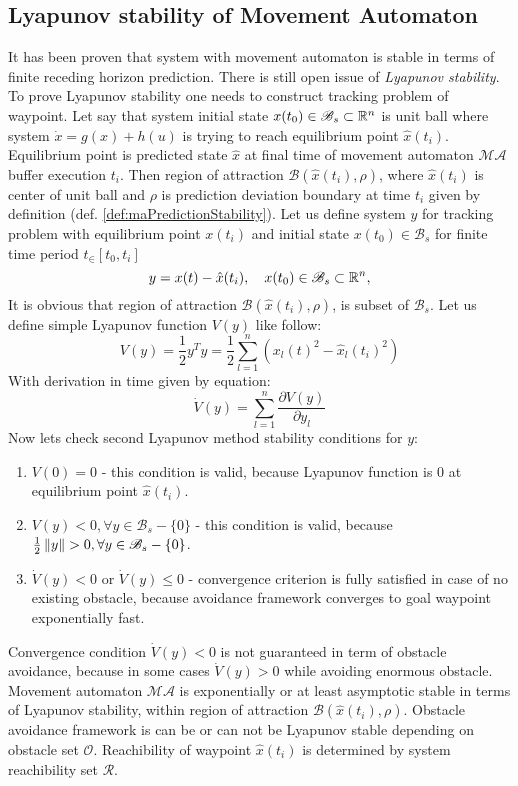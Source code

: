 \subsection{Lyapunov stability of Movement Automaton}\label{s:maLyapunov}
\noindent It has been proven that system with movement automaton is stable in terms of finite receding horizon prediction. There is still open issue of \textit{Lyapunov stability}. To prove Lyapunov stability one needs to construct tracking problem of waypoint. Let say that system initial state $x(t_0)\in \mathscr{B}_s \subset \mathbb{R}^n$ is unit ball where system $\dot{x} = g(x) + h(u)$ is trying to reach equilibrium point $\hat{x}(t_i)$. Equilibrium point is predicted state $\hat{x}$ at final time of movement automaton $\mathscr{MA}$ buffer execution $t_i$. Then region of attraction $\mathscr{B}(\hat{x}(t_i),\rho)$, where $\hat{x}(t_i)$ is center of unit ball and $\rho$ is prediction deviation boundary at time $t_i$ given by definition (def. \ref{def:maPredictionStability}). Let us define system $y$ for tracking problem with equilibrium point $x(t_i)$ and initial state $x(t_0)\in\mathscr{B}_s$ for finite time period $t_\in[t_0,t_i]$
\begin{equation}
    y = {x}(t)-\hat{x}(t_i), \quad x(t_0)\in\mathscr{B}_s\subset\mathbb{R}^n, 
\end{equation}
\noindent It is obvious that region of attraction $\mathscr{B}(\hat{x}(t_i),\rho)$, is subset of $\mathscr{B}_s$. Let us define simple Lyapunov function $V(y)$ like follow:
\begin{equation}
    V(y) = \frac{1}{2}y^Ty = \frac{1}{2}\sum_{l=1}^n\left(x_l(t)^2-\hat{x}_l(t_i)^2\right)
\end{equation}
\noindent With derivation in time given by equation:
\begin{equation}
    \dot{V}(y)= \sum_{l=1}^n \frac{\partial V(y)}{\partial y_l}
\end{equation}
\noindent Now lets check second Lyapunov method stability conditions for $y$:
\begin{enumerate}
    \item $V(0)=0$ - this condition is valid, because Lyapunov function is 0 at equilibrium point $\hat{x}(t_i)$.
    \item $V(y) < 0, \forall y\in\mathscr{B}_s-\{0\}$ - this condition is valid, because $\frac{1}{2}\left\lVert y\right\rVert>0,\forall y\in\mathscr{B}_s-\{0\}$.
    \item $\dot{V}(y)<0$ or $\dot{V}(y)\le0$ - convergence criterion is fully satisfied in case of no existing obstacle, because avoidance framework converges to goal waypoint exponentially fast.
\end{enumerate}
\noindent Convergence condition $\dot{V}(y)<0$ is not guaranteed in term of obstacle avoidance, because in some cases $\dot{V}(y)>0$ while avoiding enormous obstacle. Movement automaton $\mathscr{MA}$ is exponentially or at least asymptotic stable in terms of Lyapunov stability, within region of attraction $\mathscr{B}(\hat{x}(t_i),\rho)$. Obstacle avoidance framework is can be or can not be Lyapunov stable depending on obstacle set $\mathscr{O}$. Reachibility of waypoint $\hat{x}(t_i)$ is determined by system reachibility set $\mathscr{R}$.

